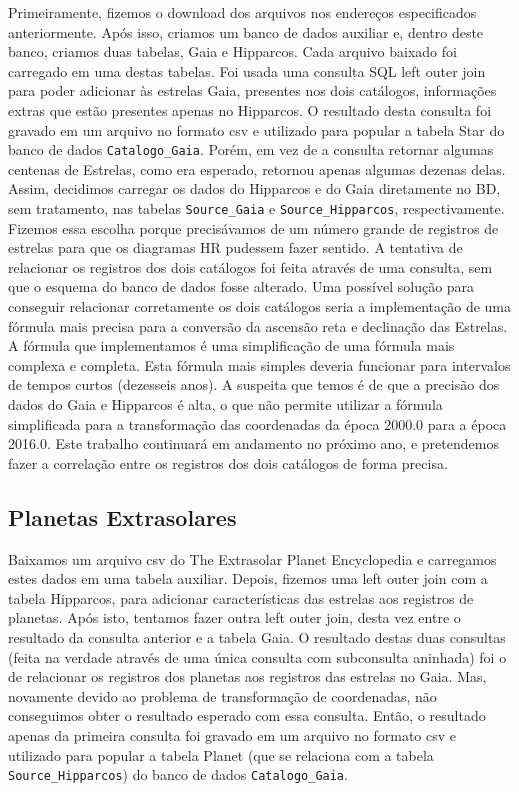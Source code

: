 \documentclass[12pt, a4paper]{article}
\begin{document}
	Primeiramente, fizemos o download dos arquivos nos endereços especificados anteriormente. Após isso, criamos um banco de dados auxiliar e, dentro deste banco, criamos duas tabelas, Gaia e Hipparcos. Cada arquivo baixado foi carregado em uma destas tabelas. Foi usada uma consulta SQL left outer join para poder adicionar às estrelas Gaia, presentes nos dois catálogos, informações extras que estão presentes apenas no Hipparcos. O resultado desta consulta foi gravado em um arquivo no formato csv e utilizado para popular a tabela Star do banco de dados \verb|Catalogo_Gaia|. Porém, em vez de a consulta retornar algumas centenas de Estrelas, como era esperado, retornou apenas algumas dezenas delas. Assim, decidimos carregar os dados do Hipparcos e do Gaia diretamente no BD, sem tratamento, nas tabelas \verb|Source_Gaia| e \verb|Source_Hipparcos|, respectivamente. Fizemos essa escolha porque precisávamos de um número grande de registros de estrelas para que os diagramas HR pudessem fazer sentido. A tentativa de relacionar os registros dos dois catálogos foi feita através de uma consulta, sem que o esquema do banco de dados fosse alterado.
	Uma possível solução para conseguir relacionar corretamente os dois catálogos seria a implementação de uma fórmula mais precisa para a conversão da ascensão reta e declinação das Estrelas. A fórmula que implementamos é uma simplificação de uma fórmula mais complexa e completa. Esta fórmula mais simples deveria funcionar para intervalos de tempos curtos (dezesseis anos). A suspeita que temos é de que a precisão dos dados do Gaia e Hipparcos é alta, o que não permite utilizar a fórmula simplificada para a transformação das coordenadas da época 2000.0 para a época 2016.0. Este trabalho continuará em andamento no próximo ano, e pretendemos fazer a correlação entre os registros dos dois catálogos de forma precisa.
	
	\subsection{Planetas Extrasolares}
	
	Baixamos um arquivo csv do The Extrasolar Planet Encyclopedia e carregamos estes dados em uma tabela auxiliar. Depois, fizemos uma left outer join com a tabela Hipparcos, para adicionar características das estrelas aos registros de planetas. Após isto, tentamos fazer outra left outer join, desta vez entre o resultado da consulta anterior e a tabela Gaia. O resultado destas duas consultas (feita na verdade através de uma única consulta com subconsulta aninhada) foi o de relacionar os registros dos planetas aos registros das estrelas no Gaia. Mas, novamente devido ao problema de transformação de coordenadas, não conseguimos obter o resultado esperado com essa consulta. Então, o resultado apenas da primeira consulta foi gravado em um arquivo no formato csv e utilizado para popular a tabela Planet (que se relaciona com a tabela \verb|Source_Hipparcos|) do banco de dados \verb|Catalogo_Gaia|.
	
\end{document}
